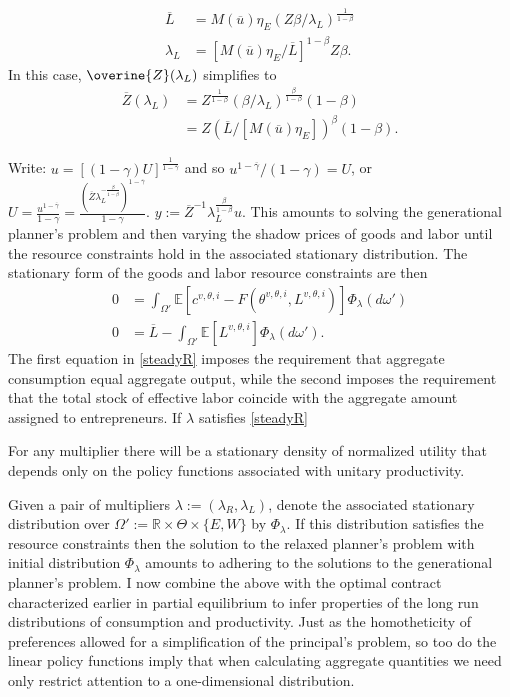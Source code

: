 \documentclass[11pt]{article}
\theoremstyle{plain}
\begin{document}
\begin{align*}
\overline{L} & = M(\overline{u}) \eta_E {\left(Z\beta/\lambda_L\right)}^{\frac{1}{1-\beta}}
\\ \lambda_L & = [M(\overline{u}) \eta_E/\overline{L}]^{1-\beta} Z\beta.
\end{align*}
In this case, $\overine{Z}(\lambda_L)$ simplifies to 
\begin{align*}
\overline{Z}(\lambda_L) & = Z^{\frac{1}{1-\beta}}(\beta/\lambda_L)^{\frac{\beta}{1-\beta}}(1 - \beta)
\\ & = Z(\overline{L}/[M(\overline{u}) \eta_E])^{\beta}(1 - \beta).
\end{align*}

Write: $u = [(1-\gamma)U]^{\frac{1}{1-\overline{\gamma}}}$ and so $u^{1-\overline{\gamma}}/(1-\gamma) = U$, or $U = \frac{u^{1-\overline{\gamma}}}{1-\gamma} = \frac{(\overline{Z}\lambda_L^{-\frac{\beta}{1-\beta}})^{1-\overline{\gamma}}}{1-\gamma}$. $y := \overline{Z}^{-1}\lambda_L^{\frac{\beta}{1-\beta}}u$. 
This amounts to solving the generational planner's problem and then varying the shadow prices of goods and labor until the resource constraints hold in the associated stationary distribution. 
The stationary form of the goods and labor resource constraints are then
\begin{equation}
\begin{aligned}
0 & = \int_{\Omega'}\mathbb{E}[c^{v,\theta,i} - F(\theta^{v,\theta,i},L^{v,\theta,i})]\Phi_{\lambda}(d\omega')
\\ 0 & = \overline{L} - \int_{\Omega'}\mathbb{E}[L^{v,\theta,i}]\Phi_{\lambda}(d\omega').
\label{steadyR}
\end{aligned}
\end{equation}
The first equation in \eqref{steadyR} imposes the requirement that aggregate consumption equal aggregate output, while the second imposes the requirement that the total stock of effective labor coincide with the aggregate amount assigned to entrepreneurs. If $\lambda$ satisfies \eqref{steadyR}

For any multiplier there will be a stationary density of normalized utility that depends only on the policy functions associated with unitary productivity. 
\fi

Given a pair of multipliers $\lambda := (\lambda_R, \lambda_L)$, denote the associated stationary distribution over $\Omega' := \mathbb{R} \times \Theta \times \{E,W\}$ by $\Phi_{\lambda}$. If this distribution satisfies the resource constraints then the solution to the relaxed planner's problem with initial distribution $\Phi_{\lambda}$ amounts to adhering to the solutions to the generational planner's problem. I now combine the above with the optimal contract characterized earlier in partial equilibrium to infer properties of the long run distributions of consumption and productivity. Just as the homotheticity of preferences allowed for a simplification of the principal's problem, so too do the linear policy functions imply that when calculating aggregate quantities we need only restrict attention to a one-dimensional distribution.
\end{document}
